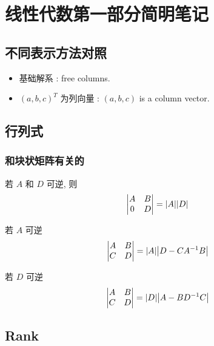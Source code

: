 \chapter{线性代数第一部分简明笔记}

\section{不同表示方法对照}

\begin{itemize}
    \item 基础解系 : free columns\cite[page 136]{strang}.
    \item $(a, b, c)^T$ 为列向量 : $(a, b ,c)$ is a column vector.
\end{itemize}

\section{行列式}
\label{determinant}

\subsection{和块状矩阵有关的}

若 $A$ 和 $D$ 可逆, 则
\[
    \begin{vmatrix*}
        A & B \\
        0 & D
    \end{vmatrix*}
    =
    \abs*{A} \abs*{D}
\]

若 $A$ 可逆
\[
    \begin{vmatrix*}
        A & B \\
        C & D
    \end{vmatrix*}
    = \abs*{A} \abs*{D - CA^{-1} B}
\]

若 $D$ 可逆
\[
    \begin{vmatrix*}
        A & B \\
        C & D
    \end{vmatrix*}
    = \abs*{D} \abs*{A - BD^{-1} C}
\]

\section{Rank}
\label{rank}

